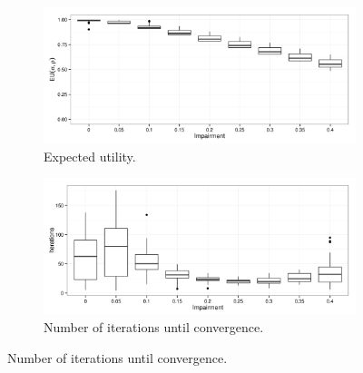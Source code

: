 \begin{figure}
        \begin{subfigure}{0.45\textwidth}
                \includegraphics[width=\textwidth]{plots/Expected-utility-20140121-141158}
                \caption{Expected utility.}
        \end{subfigure}
        \begin{subfigure}{0.45\textwidth}
                \includegraphics[width=\textwidth]{plots/Iterations-20140121-141158}
                \caption{Number of iterations until convergence.}
        \end{subfigure}
\end{figure}




